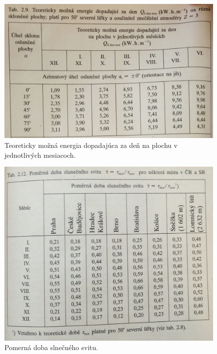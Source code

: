 \documentclass[a4paper, 11pt]{article}
\begin{document}
\begin{figure}[H] 
\centering
\includegraphics[width=.6\paperwidth]{images/str34.png}
\caption{Teoreticky možná energia dopadajúca za deň na plochu v jednotlivých mesiacoch.}
\label{str34}
\end{figure}

\begin{figure}[H] 
\centering
\includegraphics[width=.6\paperwidth]{images/str41.png}
\caption{Pomerná doba slnečného svitu.}
\label{str41}
\end{figure}
\end{document}
